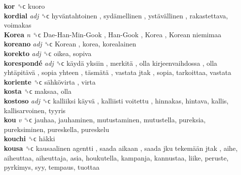 \textbf{kor} ␝ϲ  kuoro  \\
\textbf{kordial} \emph{adj}  ␝ϲ   hyväntahtoinen ,  sydämellinen ,  ystävällinen , rakastettava, voimakas  \\
\textbf{Korea} \emph{n}  ␝ϲ   Dae-Han-Min-Gook ,  Han-Gook ,  Korea ,  Korean niemimaa   \\
\textbf{koreano} \emph{adj}  ␝ϲ   Korean , korea, korealainen  \\
\textbf{korekto} \emph{adj}  ␝ϲ  oikea, sopiva  \\
\textbf{korespondé} \emph{adj}  ␝ϲ   käydä yksiin ,  merkitä ,  olla kirjeenvaihdossa ,  olla yhtäpitävä ,  sopia yhteen ,  täsmätä ,  vastata jtak , sopia, tarkoittaa, vastata  \\
\textbf{koriente} ␝ϲ   sähkövirta , virta  \\
\textbf{kosta} ␝ϲ  maksaa, olla  \\
\textbf{kostoso} \emph{adj}  ␝ϲ   kalliiksi käyvä ,  kalliisti voitettu , hinnakas, hintava, kallis, kallisarvoinen, tyyris  \\
\textbf{kou} \emph{v}  ␝ϲ  jauhaa, jauhaminen, mutustaminen, mutustella, pureksia, pureksiminen, pureskella, pureskelu  \\
\textbf{kouchi} ␝ϲ   häkki   \\
\textbf{kousa} ␝ϲ   kausaalinen agentti ,  saada aikaan ,  saada jku tekemään jtak , aihe, aiheuttaa, aiheuttaja, asia, houkutella, kampanja, kannustaa, liike, peruste, pyrkimys, syy, tempaus, tuottaa  \\
